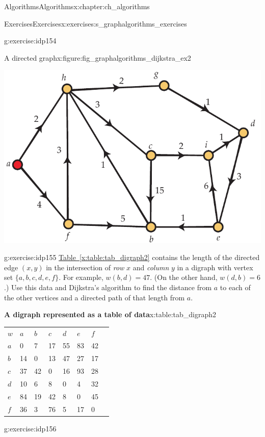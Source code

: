 \documentclass[oneside,10pt,]{book}
\newcommand{\tabularfont}{\relax}
\newcommand{\xreffont}{\relax}
\numberwithin{equation}{section}
\newcommand{\hrulethin}  {\noalign{\hrule height 0.04em}}
\begin{document}
\begin{chapterptx}{Algorithms}{}{Algorithms}{}{}{x:chapter:ch_algorithms}
\begin{exercises-section}{Exercises}{}{Exercises}{}{}{x:exercises:s_graphalgorithms_exercises}
\begin{divisionexercise}{13}{}{}{g:exercise:idp154}
\begin{figureptx}{A directed graph}{x:figure:fig_graphalgorithms_dijkstra_ex2}{}%
\begin{image}{0.175}{0.65}{0.175}%
\includegraphics[width=\linewidth]{images/dijkstra_ex2}
\end{image}%
\tcblower
\end{figureptx}%
\end{divisionexercise}%
\begin{divisionexercise}{14}{}{}{g:exercise:idp155}%
\hyperref[x:table:tab_digraph2]{Table~{\xreffont\ref{x:table:tab_digraph2}}} contains the length of the directed edge \((x,y)\) in the intersection of \emph{row} \(x\) and \emph{column} \(y\) in a digraph with vertex set \(\{a,b,c,d,e,f\}\). For example, \(w(b,d)=47\). (On the other hand, \(w(d,b)=6\).) Use this data and Dijkstra's algorithm to find the distance from \(a\) to each of the other vertices and a directed path of that length from \(a\).%
\begin{tableptx}{\textbf{A digraph represented as a table of data}}{x:table:tab_digraph2}{}%
\centering%
{\tabularfont%
\begin{tabular}{lAllllll}
\(w\)&\(a\)&\(b\)&\(c\)&\(d\)&\(e\)&\(f\)\tabularnewline\hrulethin
\(a\)&0&7&17&55&83&42\tabularnewline[0pt]
\(b\)&14&0&13&47&27&17\tabularnewline[0pt]
\(c\)&37&42&0&16&93&28\tabularnewline[0pt]
\(d\)&10&6&8&0&4&32\tabularnewline[0pt]
\(e\)&84&19&42&8&0&45\tabularnewline[0pt]
\(f\)&36&3&76&5&17&0
\end{tabular}
}%
\end{tableptx}%
\end{divisionexercise}%
\begin{divisionexercise}{15}{}{}{g:exercise:idp156}%

\end{divisionexercise}
\end{exercises-section}
\end{chapterptx}
\end{document}
